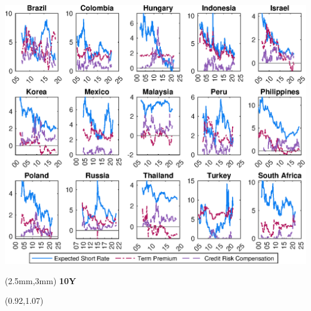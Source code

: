 \documentclass[12pt, aspectratio=169, xcolor=dvipsnames]{beamer}
\begin{document}
\begin{frame}[label=YldDcmp10]
\begin{center}							%
	\includegraphics[trim={0cm 0cm 0cm 0cm},clip,height=0.95\textheight,width=\linewidth]{../Figures/Estimation/ny_dcmp.eps} \\
\end{center}
\begin{textblock*}{15cm}(2.5mm,3mm)
	\textbf{10Y}
\end{textblock*}
\begin{textblock*}{5cm}(0.92\textwidth,1.07\textheight)
	\hyperlink{YldDcmp2}{}
\end{textblock*}
\end{frame}

\end{document}
